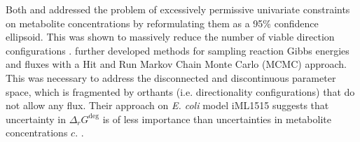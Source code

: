 





Both \textcite{gollub_2021_prob_sampling} and \textcite{vishnu_2021_multiTFA} addressed the problem of excessively permissive univariate constraints on metabolite concentrations by reformulating them as a 95\% confidence ellipsoid. This was shown to massively reduce the number of viable direction configurations \cite{gollub_2021_prob_sampling}. \textcite{gollub_2021_prob_sampling} further developed methods for sampling reaction Gibbs energies and fluxes with a Hit and Run Markov Chain Monte Carlo (MCMC) approach. This was necessary to address the disconnected and discontinuous parameter space, which is fragmented by orthants (i.e. directionality configurations) that do not allow any flux. Their approach on \textit{E. coli} model iML1515 \cite{monk_2017_ecoli} suggests that uncertainty in $\Delta_rG^\deg$ is of less importance than uncertainties in metabolite concentrations $c$.  . 